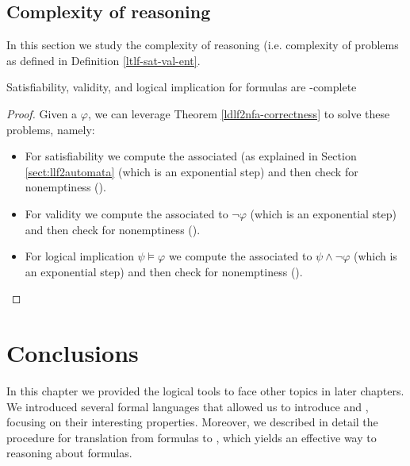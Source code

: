 \subsection{Complexity of \LLf reasoning}
In this section we study the complexity of \LLf reasoning (i.e. complexity of problems as defined in Definition \ref{ltlf-sat-val-ent}.

\begin{theorem} Satisfiability, validity, and logical implication for \LDLf formulas are \PSPACE-complete
\end{theorem}
\begin{proof}
	Given a \LLf $\varphi$, we can leverage Theorem \ref{ldlf2nfa-correctness} to solve these problems, namely:
	\begin{itemize}
		\item For \LLf satisfiability we compute the associated \NFA (as explained in Section \ref{sect:llf2automata} (which is an exponential step) and then check \NFA for nonemptiness (\NLOGSPACE).
		\item For \LLf validity we compute the \NFA associated to $\lnot \varphi$ (which is an exponential step) and then check \NFA for nonemptiness (\NLOGSPACE).
		\item For \LLf logical implication $\psi \models \varphi$ we compute the \NFA associated to $\psi \wedge \lnot \varphi$ (which is an exponential step) and then check \NFA for nonemptiness (\NLOGSPACE).
	\end{itemize}
\end{proof}


\section{Conclusions}
In this chapter we provided the logical tools to face other topics in later chapters. We introduced several formal languages that allowed us to introduce \LTLf and \LDLf, focusing on their interesting properties. Moreover, we described in detail the procedure for translation from \LLf formulas to \DFAs, which yields an effective way to reasoning about \LLf formulas.
